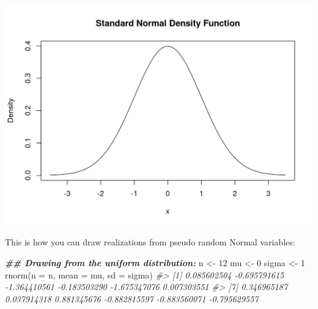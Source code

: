 \documentclass[
  14pt,
]{memoir}
\newenvironment{Shaded}{\begin{snugshade}}{\end{snugshade}}
\newcommand{\AttributeTok}[1]{\textcolor[rgb]{0.77,0.63,0.00}{#1}}
\newcommand{\CommentTok}[1]{\textcolor[rgb]{0.56,0.35,0.01}{\textit{#1}}}
\newcommand{\DecValTok}[1]{\textcolor[rgb]{0.00,0.00,0.81}{#1}}
\newcommand{\DocumentationTok}[1]{\textcolor[rgb]{0.56,0.35,0.01}{\textbf{\textit{#1}}}}
\newcommand{\FunctionTok}[1]{\textcolor[rgb]{0.00,0.00,0.00}{#1}}
\newcommand{\NormalTok}[1]{#1}
\newcommand{\OtherTok}[1]{\textcolor[rgb]{0.56,0.35,0.01}{#1}}
\begin{document}
\begin{center}\includegraphics[width=0.8\linewidth]{figure/minimal-unnamed-chunk-45-1} \end{center}

This is how you can draw realizations from pseudo random Normal variables:

\begin{Shaded}
\begin{Highlighting}[]
\DocumentationTok{\#\# Drawing from the uniform distribution:}
\NormalTok{n     }\OtherTok{\textless{}{-}} \DecValTok{12}
\NormalTok{mu    }\OtherTok{\textless{}{-}} \DecValTok{0}
\NormalTok{sigma }\OtherTok{\textless{}{-}} \DecValTok{1}
\FunctionTok{rnorm}\NormalTok{(}\AttributeTok{n =}\NormalTok{ n, }\AttributeTok{mean =}\NormalTok{ mu, }\AttributeTok{sd =}\NormalTok{ sigma) }
\CommentTok{\#\textgreater{}  [1]  0.085602504 {-}0.695791615 {-}1.364410561 {-}0.183503290 {-}1.675347076  0.007303551}
\CommentTok{\#\textgreater{}  [7]  0.346965187  0.037914318  0.881345676 {-}0.882815597 {-}0.883560071 {-}0.795629557}
\end{Highlighting}
\end{Shaded}
\end{document}

